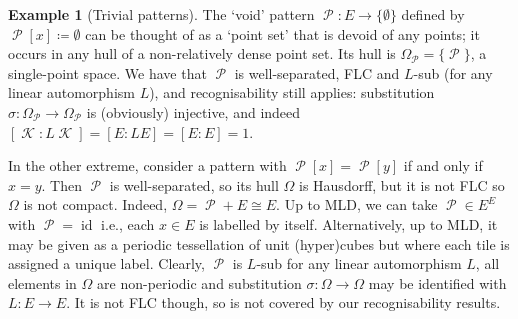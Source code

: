 \documentclass[11pt]{amsart}
\numberwithin{equation}{section}
\theoremstyle{plain}
\theoremstyle{definition}
\newtheorem{example}[theorem]{Example}
\DeclareMathOperator{\id}{\mathrm{id}}
\newcommand{\sub}{\sigma}
\DeclareMathOperator{\cP}{\mathcal{P}}
\DeclareMathOperator{\cK}{\mathcal{K}}
\begin{document}
\begin{example}[Trivial patterns]\label{exp:trivial patterns}
The `void' pattern \(\cP \colon E \to \{\emptyset\}\) defined by \(\cP[x] \coloneqq \emptyset\) can be thought of as a `point set' that is devoid of any points; it occurs in any hull of a non-relatively dense point set. Its hull is \(\Omega_{\cP} = \{\cP\}\), a single-point space. We have that \(\cP\) is well-separated, FLC and \(L\)-sub (for any linear automorphism \(L\)), and recognisability still applies: substitution \(\sub \colon \Omega_{\cP} \to \Omega_{\cP}\) is (obviously) injective, and indeed \([\cK : L\cK] = [E : LE] = [E : E] = 1\).

In the other extreme, consider a pattern with \(\cP[x] = \cP[y]\) if and only if \(x = y\). Then \(\cP\) is well-separated, so its hull \(\Omega\) is Hausdorff, but it is not FLC so \(\Omega\) is not compact. Indeed, \(\Omega = \cP + E  \cong E\). Up to MLD, we can take \(\cP \in E^E\) with \(\cP = \id\) i.e., each \(x \in E\) is labelled by itself. Alternatively, up to MLD, it may be given as a periodic tessellation of unit (hyper)cubes but where each tile is assigned a unique label. Clearly, \(\cP\) is \(L\)-sub for any linear automorphism \(L\), all elements in \(\Omega\) are non-periodic and substitution \(\sub \colon \Omega \to \Omega\) may be identified with \(L \colon E \to E\). It is not FLC though, so is not covered by our recognisability results.
\end{example}
\end{document}
